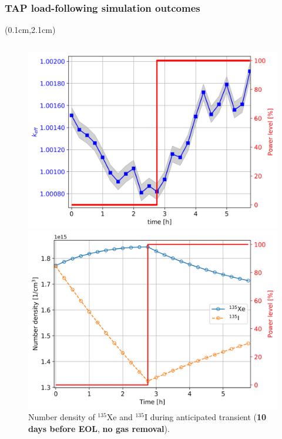 \begin{frame}
\frametitle{TAP load-following simulation outcomes}
\begin{textblock*}{12.5cm}(0.1cm,2.1cm) %
\begin{columns}
	\column[t]{6.3cm}
	\begin{figure}[t]
		\begin{overprint}
	\includegraphics[width=1.11\linewidth]{../dissertation/figures/ch5/keff_kl_1_eol_eoc_15min.png}
		\vspace{-6mm}
	\caption{$k_{eff}$ dynamics during 2.75-hour shutdown (\textbf{10 days 
		before EOL}, \textbf{no gas removal}). $\sigma\pm7$ $pcm$ is shaded.}
	\includegraphics[width=1.11\linewidth]{../dissertation/figures/ch5/xe_i_kl_1_eol_eoc_15min.png}
		\vspace{-6mm}
	\caption{Number density of $^{135}$Xe and $^{135}$I during anticipated 
	transient (\textbf{10 days before EOL}, \textbf{no gas removal}).}
		\end{overprint}
	\end{figure}
	

\end{columns}
\end{textblock*}
\end{frame}
